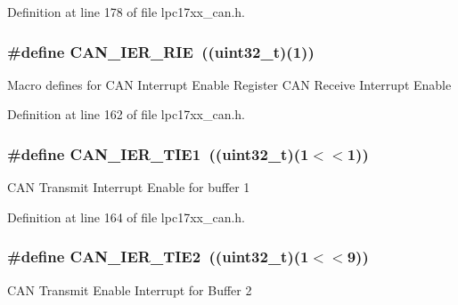 \-Definition at line 178 of file lpc17xx\-\_\-can.\-h.

\hypertarget{group___c_a_n___private___macros_ga25db0b070c10a960394a51c1374c5850}{
\subsubsection[{\-C\-A\-N\-\_\-\-I\-E\-R\-\_\-\-R\-I\-E}]{\setlength{\rightskip}{0pt plus 5cm}\#define {\bf \-C\-A\-N\-\_\-\-I\-E\-R\-\_\-\-R\-I\-E}~((uint32\-\_\-t)(1))}}\label{group___c_a_n___private___macros_ga25db0b070c10a960394a51c1374c5850}
\-Macro defines for \-C\-A\-N \-Interrupt \-Enable \-Register \-C\-A\-N \-Receive \-Interrupt \-Enable 

\-Definition at line 162 of file lpc17xx\-\_\-can.\-h.

\hypertarget{group___c_a_n___private___macros_ga8acb357ce8234e896c4f4cd550beb2c8}{
\subsubsection[{\-C\-A\-N\-\_\-\-I\-E\-R\-\_\-\-T\-I\-E1}]{\setlength{\rightskip}{0pt plus 5cm}\#define {\bf \-C\-A\-N\-\_\-\-I\-E\-R\-\_\-\-T\-I\-E1}~((uint32\-\_\-t)(1$<$$<$1))}}\label{group___c_a_n___private___macros_ga8acb357ce8234e896c4f4cd550beb2c8}
\-C\-A\-N \-Transmit \-Interrupt \-Enable for buffer 1 

\-Definition at line 164 of file lpc17xx\-\_\-can.\-h.

\hypertarget{group___c_a_n___private___macros_ga8168f7849c90eae9dae59835aac5fef8}{
\subsubsection[{\-C\-A\-N\-\_\-\-I\-E\-R\-\_\-\-T\-I\-E2}]{\setlength{\rightskip}{0pt plus 5cm}\#define {\bf \-C\-A\-N\-\_\-\-I\-E\-R\-\_\-\-T\-I\-E2}~((uint32\-\_\-t)(1$<$$<$9))}}\label{group___c_a_n___private___macros_ga8168f7849c90eae9dae59835aac5fef8}
\-C\-A\-N \-Transmit \-Enable \-Interrupt for \-Buffer 2 

